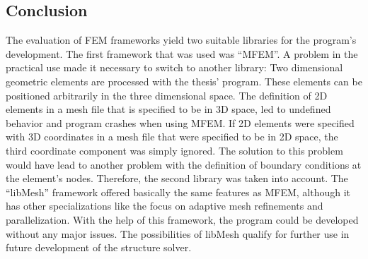  \subsection{Conclusion}
  The evaluation of FEM frameworks yield two suitable libraries for the program's development. The first framework that was used was ``MFEM''. A problem in the practical use made it necessary to switch to another library: Two dimensional geometric elements are processed with the thesis' program. These elements can be positioned arbitrarily in the three dimensional space. The definition of 2D elements in a mesh file that is specified to be in 3D space, led to undefined behavior and program crashes when using MFEM. If 2D elements were specified with 3D coordinates in a mesh file that were specified to be in 2D space, the third coordinate component was simply ignored. The solution to this problem would have lead to another problem with the definition of boundary conditions at the element's nodes. Therefore, the second library was taken into account. The ``libMesh'' framework offered basically the same features as MFEM, although it has other specializations like the focus on adaptive mesh refinements and parallelization. With the help of this framework, the program could be developed without any major issues. The possibilities of libMesh qualify for further use in future development of the structure solver.
  
